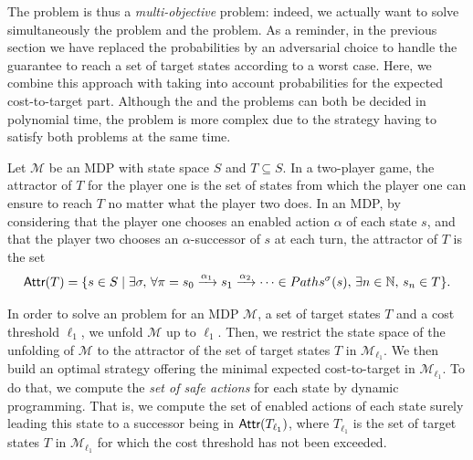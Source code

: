 The \SSPWE{} problem is thus a \textit{multi-objective} problem: indeed, we actually want to solve simultaneously the \SPG{} problem and the \SSPE{} problem.
As a reminder, in the previous section we have replaced the probabilities by an adversarial choice to handle the guarantee to reach a set of target states according to a worst case.
Here, we combine this approach with taking into account probabilities for the expected cost-to-target part.
Although the \SSPE{} and the \SPG{} problems can both be decided in polynomial time, the \SSPWE{} problem is more complex due to the strategy having to satisfy both problems at the same time.


\begin{notation}
Let $\mathcal{M}$ be an MDP with state space $S$ and $T \subseteq S$.
In a two-player game, the attractor of $T$ for the player one is the set of states from which the player one can ensure to reach $T$ no matter what the player two does.
In an MDP, by considering that the player one chooses an enabled action $\alpha$ of each state $s$, and that the player two chooses an $\alpha$-successor of $s$ at each turn, the attractor of $T$ is the set
\[\textnormal{\sffamily Attr}(T) = \{ s \in S \; | \; \exists \sigma, \, \forall \pi = s_0\xrightarrow{\alpha_1}s_1\xrightarrow{\alpha_2}\dots \in Paths^\sigma(s), \, \exists n \in \mathbb{N}, \, s_n \in T \}.\]
\end{notation}


In order to solve an \SSPWE{} problem for an MDP $\mathcal{M}$, a set of target states $T$ and a cost threshold $\ell_1$,
we unfold $\mathcal{M}$ up to $\ell_1$.
Then, we restrict the state space of the unfolding of $\mathcal{M}$ to the attractor of the set of target states $T$ in $\mathcal{M}_{\ell_1}$.
We then build an optimal strategy offering the minimal expected cost-to-target in $\mathcal{M}_{\ell_1}$.
To do that, we compute the \textit{set of safe actions} for each state by dynamic programming.
That is, we compute the set of enabled actions of each state surely leading this state to a successor being in $\textnormal{\sffamily Attr}(T_{\ell_1})$, where $T_{\ell_1}$ is the set of target states $T$ in $\mathcal{M}_{\ell_1}$ for which the cost threshold has not been exceeded.\\

